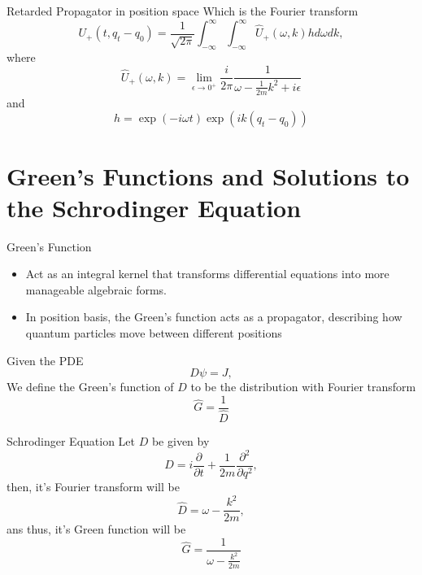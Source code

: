 \documentclass[12pt]{beamer}
\begin{document}
\begin{frame}{{Retarded Propagator in position space}}
Which is the Fourier transform 
\begin{displaymath}
  U_{+}(t,q_t - q_0) =\frac{1}{\sqrt{2\pi}}\int_{-\infty}^{\infty}\int_{-\infty}^{\infty} \hat U_{+}(\omega, k) hd\omega dk,
\end{displaymath}
where
\begin{displaymath}
  \hat U_{+}(\omega, k) = \lim_{\epsilon\rightarrow 0^{+}}\frac{i}{2\pi}\frac{1}{\omega -\frac{1}{2m}k^2+i\epsilon}
\end{displaymath}
and
\begin{displaymath}
	h = \exp(-i\omega t)\exp(ik(q_t-q_0))
\end{displaymath}
\end{frame}
\section{Green's Functions and Solutions to the Schrodinger Equation	}
\begin{frame}{Green's Function}
\begin{itemize}
	\item Act as an integral kernel that transforms differential equations into more manageable algebraic forms.
	\item In position basis, the Green's function acts as a propagator, describing how quantum particles move between different positions
\end{itemize}
Given the PDE
\begin{displaymath}
  D\psi=J,
\end{displaymath}
We define the Green's function of $D$ to be the distribution with Fourier transform
\begin{displaymath}
  \hat G = \frac{1}{\hat D}
\end{displaymath}
\end{frame}
\begin{frame}{Schrodinger Equation}
Let $D$ be given by 
\begin{displaymath}
  D = i\frac{\partial}{\partial t}+\frac{1}{2m}\frac{\partial^2}{\partial q^2},
\end{displaymath}
then, it's Fourier transform will be
\begin{displaymath}
  \hat D = \omega - \frac{k^2}{2m},
\end{displaymath}
ans thus, it's Green function will be
\begin{displaymath}
  \hat G = \frac{1}{\omega - \frac{k^2}{2m}}
\end{displaymath}
\end{frame}
\end{document}
